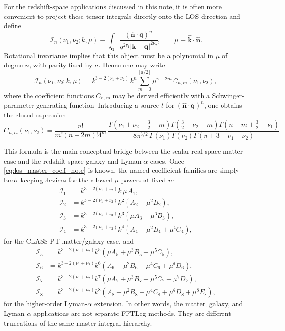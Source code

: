 \documentclass[a4paper,11pt]{article}
\newcommand{\nhat}{\hat{n}}
\newcommand{\vnhat}{\bm{\nhat}}
\newcommand{\vk}{\bm{k}}
\newcommand{\vq}{\bm{q}}
\newcommand{\<}{\langle}
\renewcommand{\>}{\rangle}
\begin{document}
For the redshift-space applications discussed in this note, it is often more convenient to project these tensor integrals directly onto the LOS direction and define
\begin{equation}
\mathcal I_n(\nu_1,\nu_2;k,\mu)
\equiv
\int_{\vq}
\frac{(\vnhat\cdot \vq)^n}{q^{2\nu_1}|\vk-\vq|^{2\nu_2}},
\qquad
\mu\equiv \hat{\vk}\cdot \vnhat.
\label{eq:los_master_def_note}
\end{equation}
Rotational invariance implies that this object must be a polynomial in \(\mu\) of degree \(n\), with parity fixed by \(n\). Hence one may write
\begin{equation}
\mathcal I_n(\nu_1,\nu_2;k,\mu)
=
k^{3-2(\nu_1+\nu_2)}\,k^n
\sum_{m=0}^{\lfloor n/2 \rfloor}
\mu^{n-2m}\,
C_{n,m}(\nu_1,\nu_2),
\label{eq:los_master_poly_note}
\end{equation}
where the coefficient functions \(C_{n,m}\) may be derived efficiently with a Schwinger-parameter generating function. Introducing a source \(t\) for \((\vnhat\cdot \vq)^n\), one obtains the closed expression
\begin{equation}
C_{n,m}(\nu_1,\nu_2)
=
\frac{n!}{m!(n-2m)!4^m}\,
\frac{
\Gamma\!\left(\nu_1+\nu_2-\frac32-m\right)
\Gamma\!\left(\frac32-\nu_2+m\right)
\Gamma\!\left(n-m+\frac32-\nu_1\right)
}{
8\pi^{3/2}\,
\Gamma(\nu_1)\Gamma(\nu_2)\Gamma(n+3-\nu_1-\nu_2)
}.
\label{eq:los_master_coeff_note}
\end{equation}

This formula is the main conceptual bridge between the scalar real-space matter case and the redshift-space galaxy and Lyman-\(\alpha\) cases. Once \cref{eq:los_master_coeff_note} is known, the named coefficient families are simply book-keeping devices for the allowed \(\mu\)-powers at fixed \(n\):
\begin{align}
\mathcal I_1 &= k^{3-2(\nu_1+\nu_2)}k\,\mu\,A_1,\\
\mathcal I_2 &= k^{3-2(\nu_1+\nu_2)}k^2\left(A_2+\mu^2 B_2\right),\\
\mathcal I_3 &= k^{3-2(\nu_1+\nu_2)}k^3\left(\mu A_3+\mu^3 B_3\right),\\
\mathcal I_4 &= k^{3-2(\nu_1+\nu_2)}k^4\left(A_4+\mu^2 B_4+\mu^4 C_4\right),
\label{eq:los_master_galaxy_families_note}
\end{align}
for the CLASS-PT matter/galaxy case, and
\begin{align}
\mathcal I_5 &= k^{3-2(\nu_1+\nu_2)}k^5\left(\mu A_5+\mu^3 B_5+\mu^5 C_5\right),\\
\mathcal I_6 &= k^{3-2(\nu_1+\nu_2)}k^6\left(A_6+\mu^2 B_6+\mu^4 C_6+\mu^6 D_6\right),\\
\mathcal I_7 &= k^{3-2(\nu_1+\nu_2)}k^7\left(\mu A_7+\mu^3 B_7+\mu^5 C_7+\mu^7 D_7\right),\\
\mathcal I_8 &= k^{3-2(\nu_1+\nu_2)}k^8\left(A_8+\mu^2 B_8+\mu^4 C_8+\mu^6 D_8+\mu^8 E_8\right),
\label{eq:los_master_lya_families_note}
\end{align}
for the higher-order Lyman-\(\alpha\) extension. In other words, the matter, galaxy, and Lyman-\(\alpha\) applications are not separate FFTLog methods. They are different truncations of the same master-integral hierarchy.
\end{document}
